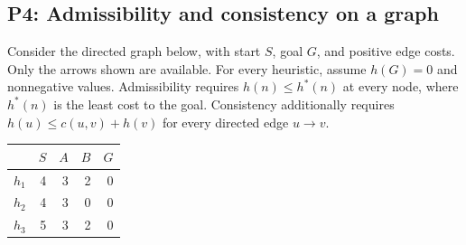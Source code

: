 \documentclass[11pt]{article}
\begin{document}
\clearpage
\subsection*{P4: Admissibility and consistency on a graph}

Consider the directed graph below, with start $S$, goal $G$, and positive
edge costs. Only the arrows shown are available. For every heuristic,
assume $h(G)=0$ and nonnegative values. Admissibility requires
$h(n)\leq h^*(n)$ at every node, where $h^*(n)$ is the least cost to the
goal. Consistency additionally requires $h(u)\leq c(u,v)+h(v)$ for every
directed edge $u\to v$.

\begin{center}
\begin{minipage}[c]{0.48\linewidth}\centering
{}
\end{minipage}
\begin{minipage}[c]{0.35\linewidth}\centering
\begin{tabular}{c|rrrr}
 & $S$ & $A$ & $B$ & $G$\\\hline
$h_1$ & 4 & 3 & 2 & 0\\
$h_2$ & 4 & 3 & 0 & 0\\
$h_3$ & 5 & 3 & 2 & 0
\end{tabular}
\end{minipage}
\end{center}
\end{document}
